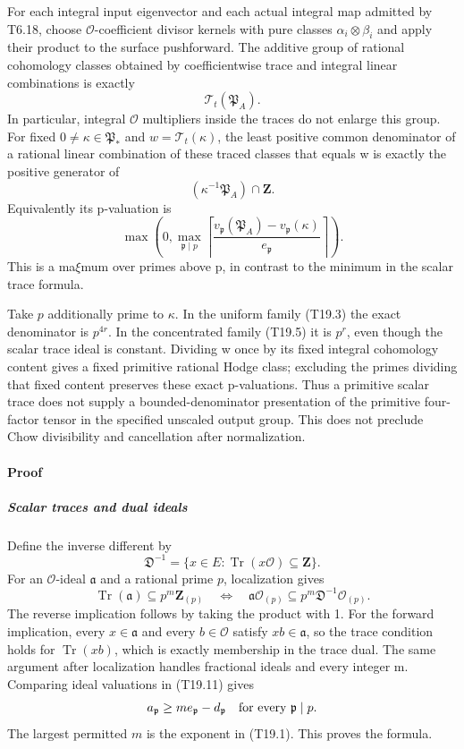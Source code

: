 For each integral input eigenvector and each actual integral map admitted by T6.18, choose \(\mathcal O\)-coefficient divisor kernels with pure classes \(\alpha_i\otimes\beta_i\) and apply their product to the surface pushforward. The additive group of rational cohomology classes obtained by coefficientwise trace and integral linear combinations is exactly \[
 \mathcal T_t(\mathfrak P_A).
 \tag{T19.8}
\] In particular, integral \(\mathcal O\) multipliers inside the traces do not enlarge this group. For fixed \(0\ne\kappa\in\mathfrak P_*\) and \(w=\mathcal T_t(\kappa)\), the least positive common denominator of a rational linear combination of these traced classes that equals w is exactly the positive generator of \[
 (\kappa^{-1}\mathfrak P_A)\cap\mathbf Z.
 \tag{T19.9}
\] Equivalently its p-valuation is \[
 \max\left(0,\max_{\mathfrak p\mid p}
     \left\lceil\frac{v_{\mathfrak p}(\mathfrak P_A)
                           -v_{\mathfrak p}(\kappa)}{e_{\mathfrak p}}\right\rceil\right).
 \tag{T19.10}
\] This is a ma\(\xi\)mum over primes above p, in contrast to the minimum in the scalar trace formula.

Take \(p\) additionally prime to \(\kappa\). In the uniform family (T19.3) the exact denominator is \(p^{4r}\). In the concentrated family (T19.5) it is \(p^r\), even though the scalar trace ideal is constant. Dividing w once by its fixed integral cohomology content gives a fixed primitive rational Hodge class; excluding the primes dividing that fixed content preserves these exact p-valuations. Thus a primitive scalar trace does not supply a bounded-denominator presentation of the primitive four-factor tensor in the specified unscaled output group. This does not preclude Chow divisibility and cancellation after normalization.

\paragraph{Proof}\label{proof}

\subparagraph{Scalar traces and dual ideals}\label{scalar-traces-and-dual-ideals}

Define the inverse different by \[
 \mathfrak D^{-1}=\{x\in E:\operatorname{Tr}(x\mathcal O)\subseteq\mathbf Z\}.
\] For an \(\mathcal O\)-ideal \(\mathfrak a\) and a rational prime \(p\), localization gives \[
 \operatorname{Tr}(\mathfrak a)\subseteq p^m\mathbf Z_{(p)}
 \quad\Longleftrightarrow\quad
 \mathfrak a\mathcal O_{(p)}\subseteq p^m\mathfrak D^{-1}\mathcal O_{(p)}.
 \tag{T19.11}
\] The reverse implication follows by taking the product with 1. For the forward implication, every \(x\in\mathfrak a\) and every \(b\in\mathcal O\) satisfy \(xb\in\mathfrak a\), so the trace condition holds for \(\operatorname{Tr}(xb)\), which is exactly membership in the trace dual. The same argument after localization handles fractional ideals and every integer m. Comparing ideal valuations in (T19.11) gives \[
 a_{\mathfrak p}\ge me_{\mathfrak p}-d_{\mathfrak p}
 \quad\hbox{for every }\mathfrak p\mid p.
\] The largest permitted \(m\) is the exponent in (T19.1). This proves the formula.

